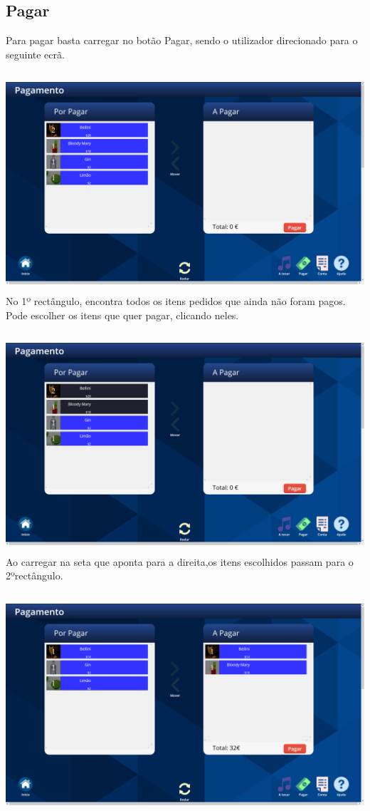 \documentclass{article}
\begin{document}
\subsection{Pagar}
Para pagar basta carregar no botão Pagar, sendo o utilizador direcionado  para o seguinte ecrã. \\\\ 
\includegraphics[width=15cm, height=8cm]{user_manual_images/pay_menu.png}
No 1º rectângulo, encontra todos os itens pedidos que ainda não foram pagos.\\
Pode escolher os itens que quer pagar, clicando neles.\\\\
\includegraphics[width=15cm, height=8cm]{user_manual_images/select_pay.png}
Ao carregar na seta que aponta para a direita,os itens escolhidos passam para o 2ºrectângulo.\\\\
\includegraphics[width=15cm, height=8cm]{user_manual_images/moved_itens.png}
\end{document}
